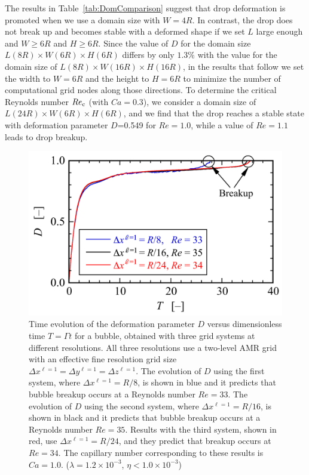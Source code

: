 \documentclass[%
 reprint,
 showkeys,
 amsmath,amssymb,
 aps,
 prfluids,
 onecolumn
]{revtex4-2}
\newcommand{\lwh}[3]{L(#1R)\times W(#2R) \times H(#3R)}
\begin{document}
The results in Table~\ref{tab:DomComparison} suggest that drop deformation is
promoted when we use a domain size with $W=4R$.  In contrast, the drop does not
break up and becomes stable with a deformed shape if we set $L$ large enough
and $W \geq 6R$ and $H \geq 6R$.  Since the value of {\color{red} $D$} for the domain size
$\lwh{8}{6}{6}$ differs by only $1.3\%$ with the value for the domain size of
$\lwh{8}{16}{16}$, in the results that follow we set the width to $W=6R$ and the
height to $H=6R$ to minimize the number of computational grid nodes along those
directions.  To determine the critical Reynolds number $Re_{\rm c}$ (with $Ca=0.3$),
we consider a domain size of $\lwh{24}{6}{6}$, and we find that the drop
reaches a stable state with deformation parameter {\color{red} $D$}=0.549 for $Re=1.0$,
while a value of $Re=1.1$ leads to drop breakup.
% 
\begin{figure}%
  \centering
  \includegraphics[width=\textwidth]{Fig3-Comparison-of-De-New}
  \caption{Time evolution of the deformation 
   parameter {\color{red} $D$} versus 
   dimensionless
   time $T = \mathit{\Gamma} t$ for a bubble, obtained 
   with three grid systems at different resolutions. All three resolutions 
   use a two-level AMR grid with an effective fine resolution  
   grid size $\Delta x^{\ell=1} = \Delta y^{\ell=1} = 
   \Delta z ^{\ell=1}$. 
   The evolution of {\color{red} $D$} using the first system, where
   $\Delta x^{\ell=1} = R/8$, is shown in blue and it predicts that 
   bubble breakup occurs at a Reynolds number $Re=33$.
   The evolution of {\color{red} $D$} using the second system, where
   $\Delta x^{\ell=1} = R/16$, is shown in black and it predicts that 
   bubble breakup occurs at a Reynolds number $Re=35$.
   Results with the third system, shown in red, use $\Delta x^{\ell=1} 
   = R/24$, and they predict that breakup occurs at $Re=34$.  The capillary
   number corresponding to these results is $Ca=1.0$.
   ($\lambda = 1.2 \times 10^{-3}$, $\eta < 1.0 \times 10^{-3}$)}
  \label{fig:DeEvolution}
\end{figure}
%
\end{document}
